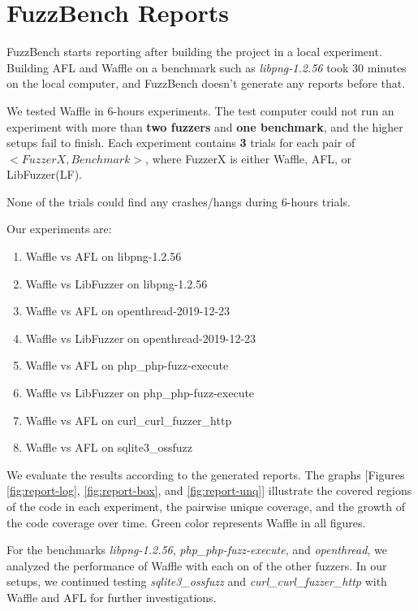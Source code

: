 \section{FuzzBench Reports}
\label{sec:report}

FuzzBench starts reporting after building the project in a local experiment. Building AFL and Waffle on a benchmark such as \textit{libpng-1.2.56} took 30 minutes on the local computer, and FuzzBench doesn't generate any reports before that.

We tested Waffle in 6-hours experiments. The test computer could not run an experiment with more than \textbf{two fuzzers} and \textbf{one benchmark}, and the higher setups fail to finish. Each experiment contains \textbf{3} trials for each pair of $<FuzzerX, Benchmark>$, where FuzzerX is either Waffle, AFL, or LibFuzzer(LF). 

None of the trials could find any crashes/hangs during 6-hours trials.

Our experiments are:

\begin{enumerate}
    \item Waffle vs AFL on libpng-1.2.56
    \item Waffle vs LibFuzzer on libpng-1.2.56
    \item Waffle vs AFL on openthread-2019-12-23
    \item Waffle vs LibFuzzer on openthread-2019-12-23
    \item Waffle vs AFL on php\_php-fuzz-execute
    \item Waffle vs LibFuzzer on php\_php-fuzz-execute
    \item Waffle vs AFL on curl\_curl\_fuzzer\_http
    \item Waffle vs AFL on sqlite3\_ossfuzz
\end{enumerate}

We evaluate the results according to the generated reports. The graphs [Figures \ref{fig:report-log}, \ref{fig:report-box}, and \ref{fig:report-unq}] illustrate the covered regions of the code in each experiment, the pairwise unique coverage, and the growth of the code coverage over time. Green color represents Waffle in all figures.



For the benchmarks \textit{libpng-1.2.56}, \textit{php\_php-fuzz-execute}, and \textit{openthread}, we analyzed the performance of Waffle with each on of the other fuzzers. In our setups, we continued testing \textit{sqlite3\_ossfuzz} and \textit{curl\_curl\_fuzzer\_http} with Waffle and AFL for further investigations.


